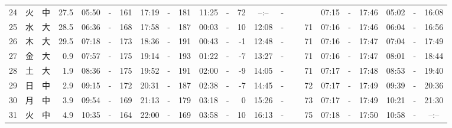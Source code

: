 \documentclass[12pt,a4j]{jsarticle}
\begin{document}
\begin{table}[htbp]
\begin{center}
{\begin{tabular}{|rc|cr|ccrccr|ccrccr|ccc|ccc|}
24 & 火 & 中 & 27.5 &  05:50 &-& 161 &  17:19 &-& 181 &  11:25 &-&  72 &  --:-- &-&~~~~~ & 07:15 & -& 17:46 & 05:02 & -& 16:08 \\
25 & 水 & 大 & 28.5 &  06:36 &-& 168 &  17:58 &-& 187 &  00:03 &-&  10 &  12:08 &-&  71 & 07:16 & -& 17:46 & 06:04 & -& 16:56 \\
26 & 木 & 大 & 29.5 &  07:18 &-& 173 &  18:36 &-& 191 &  00:43 &-&  -1 &  12:48 &-&  71 & 07:16 & -& 17:47 & 07:04 & -& 17:49 \\
27 & 金 & 大 &  0.9 &  07:57 &-& 175 &  19:14 &-& 193 &  01:22 &-&  -7 &  13:27 &-&  71 & 07:16 & -& 17:47 & 08:01 & -& 18:44 \\
28 & 土 & 大 &  1.9 &  08:36 &-& 175 &  19:52 &-& 191 &  02:00 &-&  -9 &  14:05 &-&  71 & 07:17 & -& 17:48 & 08:53 & -& 19:40 \\
29 & 日 & 中 &  2.9 &  09:15 &-& 172 &  20:31 &-& 187 &  02:38 &-&  -7 &  14:45 &-&  72 & 07:17 & -& 17:49 & 09:39 & -& 20:36 \\
30 & 月 & 中 &  3.9 &  09:54 &-& 169 &  21:13 &-& 179 &  03:18 &-&   0 &  15:26 &-&  73 & 07:17 & -& 17:49 & 10:21 & -& 21:30 \\
31 & 火 & 中 &  4.9 &  10:35 &-& 164 &  22:00 &-& 169 &  03:58 &-&  10 &  16:13 &-&  75 & 07:18 & -& 17:50 & 10:58 & -& --:-- \\
   \hline
   \end{tabular}}
   \end{center}
\end{table}
\newpage
\end{document}
